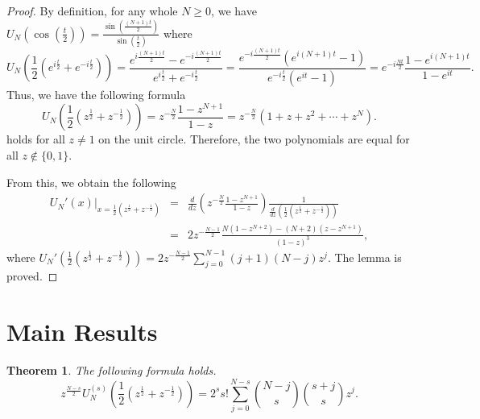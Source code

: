 \documentclass[12pt]{article}
\newtheorem{thm}{Theorem}[section]
\newcommand{\pa}[1]{\left(#1\right)}
\begin{document}
\begin{proof}
By definition, for any whole $N \geq 0$, we have
$\displaystyle U_N\pa{\cos\pa{\frac{t}{2}}} = \frac{\sin\pa{\frac{(N + 1)t}{2}}}{\sin\pa{\frac{t}{2}}}$ where
\begin{displaymath}
U_N\pa{\frac{1}{2}\pa{e^{i\frac{t}{2}} + e^{-i\frac{t}{2}}}} = \frac{e^{i\frac{(N + 1)t}{2}} - e^{-i\frac{(N + 1)t}{2}}}{e^{i\frac{t}{2}} + e^{-i\frac{t}{2}}} = \frac{e^{-i\frac{(N + 1)t}{2}}\pa{e^{i(N + 1)t} - 1}}{e^{-i\frac{t}{2}}\pa{e^{it} - 1}} = e^{-i\frac{Nt}{2}}\frac{1 - e^{i(N + 1)t}}{1 - e^{it}}.
\end{displaymath}
Thus, we have the following formula
\begin{displaymath}
U_N\pa{\frac{1}{2}\pa{z^{\frac{1}{2}} + z^{-\frac{1}{2}}}} = z^{-\frac{N}{2}}\frac{1 - z^{N + 1}}{1 - z} = z^{-\frac{N}{2}}\pa{1 + z + z^2 + \cdots + z^N}.
\end{displaymath}
holds for all $z \neq 1$ on the unit circle. Therefore, the two polynomials are equal for all $z \notin \{0,1\}$.

From this, we obtain the following
\begin{eqnarray*}
U_N'(x)\Big|_{x = \frac{1}{2}\pa{z^{\frac{1}{2}} + z^{-\frac{1}{2}}}} &=& \frac{d}{dz}\pa{z^{-\frac{N}{2}}\frac{1 - z^{N + 1}}{1 - z}} \frac{1}{\frac{d}{dz}\pa{\frac{1}{2}\pa{z^{\frac{1}{2}} + z^{-\frac{1}{2}}}}} \\
&=& 2z^{-\frac{N - 1}{2}} \frac{N(1 - z^{N + 2})-(N + 2)\pa{z - z^{N + 1}}}{(1 - z)^3},
\end{eqnarray*}
where
$U_N'\pa{\frac{1}{2}\pa{z^{\frac{1}{2}} + z^{-\frac{1}{2}}}} = 2z^{-\frac{N - 1}{2}}\sum_{j = 0}^{N - 1}(j + 1)(N - j)z^j$.
The lemma is proved.
\end{proof}


\section{Main Results}
\begin{thm}\label{thm2} The following formula holds.
\begin{equation}\label{cheby-der-eqn3}
z^{\frac{N-s}{2}}U_N^{(s)}\pa{\frac{1}{2}\pa{z^{\frac{1}{2}} + z^{-\frac{1}{2}}}} = {2^s}{s!}\sum_{j = 0}^{N - s}{N-j\choose s}{s+j\choose s}z^j.
\end{equation}
\end{thm}
\end{document}
